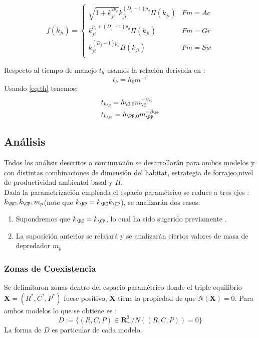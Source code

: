\begin{equation}\label{eq:fkr}
f(k_{ji}) = 
\begin{cases}
\sqrt{1+k_{ji}^{2p_v}}k_{ji}^{(D_j-1)p_d} \Pi(k_{ji}) & Fm = Ac\\
k_{ji}^{p_v+(D_j-1)p_d}\Pi(k_{ji}) & Fm =Gr\\
k_{ji}^{(D_j-1)p_d}\Pi(k_{ji}) & Fm = Sw\\
\end{cases}
\end{equation}

Respecto al tiempo de manejo $t_h$ usamos la relaci\'on derivada en \cite{pawar2012dimensionality} :
\begin{equation}\label{eq:th}
 t_h = h_0m^{-\beta}
\end{equation}
Usando \eqref{eq:th} tenemos:
\begin{equation}
\begin{aligned}
&t_{h_\C} = h_{\C,0} m_\C ^{-\beta_\C} \\
&t_{h_\PP} = h_{\PP,0}m_\PP^{-\beta_\PP}
\end{aligned}
\end{equation}


\subsection{An\'alisis}
Todos los an\'alisis descritos a continuaci\'on se desarrollar\'an para ambos modelos y con distintas combinaciones de dimensi\'on del habitat, estrategia de forrajeo,nivel de productividad ambiental basal y $\Pi$.\\
Dada la parametrizaci\'on empleada el espacio param\'etrico se reduce a tres ejes : $k_\RC,k_\CP, m_p$(note que $k_\RP = k_\RC k_\CP$), se analizar\'an dos casos:
\begin{enumerate}
\item Supondremos que $k_\RC = k_\CP$, lo cual ha sido sugerido previamente \citep{peters1986ecological,brown2004toward}.\label{equalsizeratios}
\item La suposici\'on anterior se relajar\'a y se analizar\'an ciertos valores de masa de depredador $m_p$
\end{enumerate}


\subsubsection{Zonas de Coexistencia}
Se delimitaron zonas dentro del espacio param\'etrico donde el triple equilibrio $\mathbf{X} = (R^*,C^*,P^*)$ fuese positivo, $\mathbf{X}$ tiene la propiedad de que $N(\mathbf{X}) = 0$. Para ambos modelos lo que se obtiene es :
\begin{equation}\label{eq:Equilibrio}
D:= \{ (R,C,P) \in \mathbf{R}^3_+ / N((R,C,P)) = 0 \}
\end{equation}
La forma de $D$ es particular de cada modelo.

